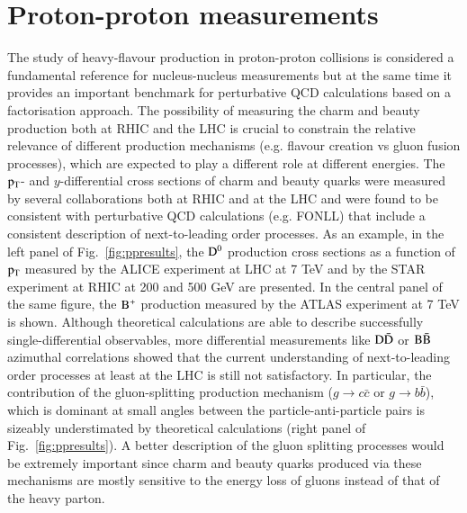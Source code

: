 \documentclass{webofc}
\begin{document}
\section{Proton-proton measurements}
\label{ppmeasurements}
The study of heavy-flavour production in proton-proton collisions is considered a fundamental reference for nucleus-nucleus measurements but at the same time it provides
an important benchmark for perturbative QCD calculations based on a factorisation approach. The possibility of measuring the charm and beauty production both at RHIC and the LHC is crucial to constrain the relative relevance 
of different production mechanisms (e.g. flavour creation vs gluon fusion processes), which are expected to play a different role at different energies. The $\rm p_{\rm T} $- and $y$-differential cross sections of charm and beauty quarks were 
measured by several collaborations both at RHIC and at the LHC and were found to be consistent with perturbative QCD calculations (e.g. FONLL) that include a consistent description of next-to-leading order processes. 
As an example, in the left panel of Fig.~\ref{fig:ppresults}, the $\rm D^{0}$ production cross sections as a function of $\rm p_{\rm T} $ measured by the ALICE experiment at LHC at 7 TeV and by the STAR experiment at RHIC at 200 and 500 GeV are presented. 
In the central panel of the same figure, the $\rm B^{+}$ production measured by the ATLAS  experiment at 7 TeV is shown. Although theoretical calculations are able to describe successfully single-differential 
observables, more differential measurements like $\rm D \bar{D}$ or $\rm B \bar{B}$ azimuthal correlations showed that the current understanding of next-to-leading order processes at least at the LHC is still not satisfactory. In particular, 
the contribution of the gluon-splitting production mechanism ($g \rightarrow c\bar{c}$ or $g \rightarrow b\bar{b}$), which is dominant at small angles between the particle-anti-particle pairs is 
sizeably understimated by theoretical calculations (right panel of Fig.~\ref{fig:ppresults}). A better description of the gluon splitting processes would be extremely important since charm 
and beauty quarks produced via these mechanisms are mostly sensitive to the energy loss of gluons instead of that of the heavy parton. 
\end{document}
